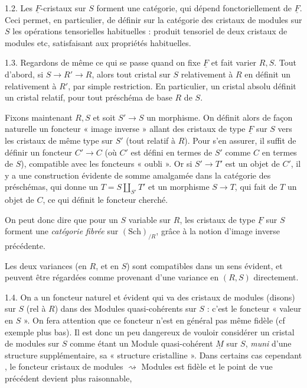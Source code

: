 \documentclass[11pt,a4paper]{article}
\begin{document}
1.2. Les $\underline{F}$-cristaux sur $S$ forment une catégorie, qui dépend
fonctoriellement de $\underline{F}$. Ceci permet, en particulier, de définir sur
la catégorie des cristaux de modules sur $S$ les opérations tensorielles
habituelles : produit tensoriel de deux cristaux de modules etc, satisfaisant
aux propriétés habituelles.

1.3. Regardons de même ce qui se passe quand on fixe $\underline{F}$ et fait
varier $R,S$. Tout d'abord, si $S\to R'\to R$, alors tout cristal sur $S$
relativement à $R$ en définit un relativement à $R'$, par simple restriction.
En particulier, un cristal absolu définit un cristal relatif, pour tout
préschéma de base $R$ de $S$.

Fixons maintenant $R,S$ et soit $S'\to S$ un morphisme. On définit alors de
façon naturelle un foncteur « image inverse » allant des cristaux de type
$\underline{F}$ sur $S$ vers les cristaux de même type sur $S'$ (tout relatif
à $R$). Pour s'en assurer, il suffit de définir un foncteur $C'\to C$ (où $C'$
est défini en termes de $S'$ comme $C$ en termes de $S$), compatible avec les
foncteurs « oubli ». Or si $S'\to T'$ est un objet de $C'$, il y a une
construction évidente de somme amalgamée dans la catégorie des préschémas, qui
donne un $T=S\amalg_{S'}T'$ et un morphisme $S\to T$, qui fait de $T$ un objet
de $C$, ce qui définit le foncteur cherché.

On peut donc dire que pour un $S$ variable sur $R$, les cristaux de type
$\underline{F}$ sur $S$ forment une \emph{catégorie fibrée} sur
$(\mathrm{Sch})_{/R}$, grâce à la notion d'image inverse précédente.

Les deux variances (en $R$, et en $S$) sont compatibles dans un sens évident,
et peuvent être régardées comme provenant d'une variance en $(R,S)$
directement.

1.4. On a un foncteur naturel et évident qui va des cristaux de modules
(disons) sur $S$ (rel à $R$) dans des Modules quasi-cohérents sur $S$ : c'est
le foncteur « valeur en $S$ ». On fera attention que ce foncteur n'est en
général pas même fidèle (cf exemple  plus bas). Il est donc un peu
dangereux de vouloir considérer un cristal de modules sur $S$ comme étant un
Module quasi-cohérent $\underline{M}$ sur $S$, \emph{muni} d'une structure
supplémentaire, sa « structure cristalline ». Dans certains cas cependant
, le foncteur cristaux de modules $\rightsquigarrow$ Modules est
fidèle et le point de vue précédent devient plus raisonnable,
\end{document}
